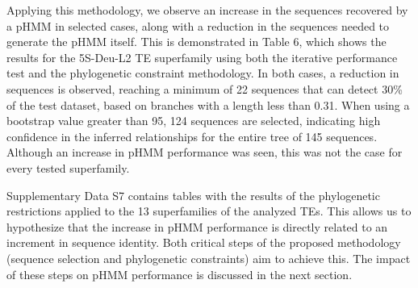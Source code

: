 \documentclass[unnumsec,webpdf,contemporary,large]{oup-authoring-template}%
\theoremstyle{thmstyleone}%
\theoremstyle{thmstyletwo}%
\theoremstyle{thmstylethree}%
\begin{document}
Applying this methodology, we observe an increase in the sequences recovered by a pHMM in selected cases, along with a reduction in the sequences needed to generate the pHMM itself. This is demonstrated in Table 6, which shows the results for the 5S-Deu-L2 TE superfamily using both the iterative performance test and the phylogenetic constraint methodology. In both cases, a reduction in sequences is observed, reaching a minimum of 22 sequences that can detect 30\% of the test dataset, based on branches with a length less than 0.31. When using a bootstrap value greater than 95, 124 sequences are selected, indicating high confidence in the inferred relationships for the entire tree of 145 sequences. Although an increase in pHMM performance was seen, this was not the case for every tested superfamily.

Supplementary Data S7 contains tables with the results of the phylogenetic restrictions applied to the 13 superfamilies of the analyzed TEs. This allows us to hypothesize that the increase in pHMM performance is directly related to an increment in sequence identity. Both critical steps of the proposed methodology (sequence selection and phylogenetic constraints) aim to achieve this. The impact of these steps on pHMM performance is discussed in the next section.
\end{document}
